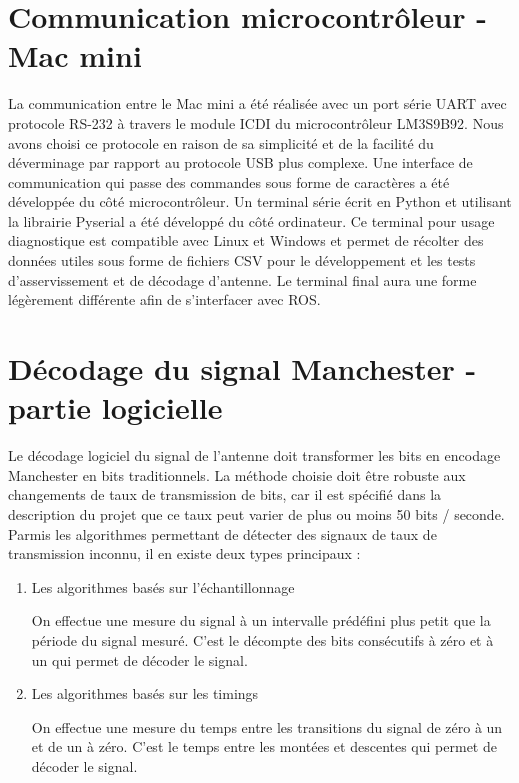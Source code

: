 \section{Communication microcontrôleur - Mac mini}

La communication entre le Mac mini a été réalisée avec un port série UART avec protocole RS-232 à travers le module ICDI du microcontrôleur LM3S9B92. Nous avons choisi ce protocole en raison de sa simplicité et de la facilité du déverminage par rapport au protocole USB plus complexe. Une interface de communication qui passe des commandes sous forme de caractères a été développée du côté microcontrôleur. Un terminal série écrit en Python et utilisant la librairie Pyserial a été développé du côté ordinateur. Ce terminal pour usage diagnostique est compatible avec Linux et Windows et permet de récolter des données utiles sous forme de fichiers CSV pour le développement et les tests d'asservissement et de décodage d'antenne. Le terminal final aura une forme légèrement différente afin de s'interfacer avec ROS.

\section{Décodage du signal Manchester - partie logicielle}

Le décodage logiciel du signal de l'antenne doit transformer les bits en encodage Manchester en bits traditionnels. La méthode choisie doit être robuste aux changements de taux de transmission de bits, car il est spécifié dans la description du projet que ce taux peut varier de plus ou moins 50 bits / seconde. Parmis les algorithmes permettant de détecter des signaux de taux de transmission inconnu, il en existe deux types principaux : 

\begin{enumerate}
\item{Les algorithmes basés sur l'échantillonnage}

On effectue une mesure du signal à un intervalle prédéfini plus petit que la période du signal mesuré. C'est le décompte des bits consécutifs à zéro et à un qui permet de décoder le signal.

\item{Les algorithmes basés sur les timings} 

On effectue une mesure du temps entre les transitions du signal de zéro à un et de un à zéro. C'est le temps entre les montées et descentes qui permet de décoder le signal.
\end{enumerate}

